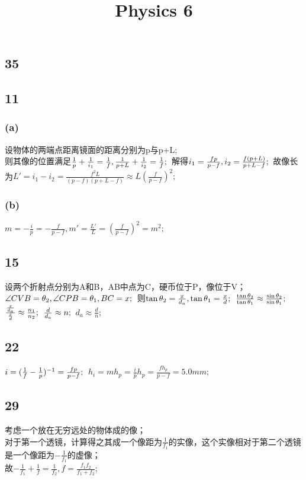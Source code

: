\documentclass{article}
\title{Physics 6}
\begin{document}
	\begin{CJK}{UTF8}{gbsn}
		\maketitle
		\section{35}
		\subsection{11}
		\subsubsection{(a)}
		设物体的两端点距离镜面的距离分别为p与p+L;\\
		则其像的位置满足$\frac{1}{p}+\frac{1}{i_1}=\frac{1}{f},\frac{1}{p+L}+\frac{1}{i_2}=\frac{1}{f};\\$
		解得$i_1=\frac{fp}{p-f},i_2=\frac{f(p+L)}{p+L-f};\\$
		故像长为$L'=i_1-i_2=\frac{f^2L}{(p-f)(p+L-f)}\approx L(\frac{f}{p-f})^2;$
		\subsubsection{(b)}
		$m=-\frac{i}{p}=-\frac{f}{p-f},m'=\frac{L'}{L}=(\frac{f}{p-f})^2=m^2;$
		\subsection{15}
		设两个折射点分别为A和B，AB中点为C，硬币位于P，像位于V；\\
		$\angle CVB=\theta_2,\angle CPB=\theta_1,BC=x;\\$
		则$\tan\theta_2=\frac{x}{d_a},\tan\theta_1=\frac{x}{d};\\$
		$\frac{\tan\theta_2}{\tan\theta_1}\approx\frac{\sin\theta_2}{\sin\theta_1};\\$
		$\frac{\frac{x}{d_a}}{\frac{x}{d}}\approx\frac{n_1}{n_2};\\$
		$\frac{d}{d_a}\approx n;\\$
		$d_a\approx \frac{d}{n};$
		\subsection{22}
		$i=(\frac{1}{f}-\frac{1}{p})^{-1}=\frac{fp}{p-f};\\$
		$h_i=mh_p=\frac{i}{p}h_p=\frac{fh_p}{p-f}=5.0mm;$
		\subsection{29}
		考虑一个放在无穷远处的物体成的像；\\
		对于第一个透镜，计算得之其成一个像距为$\frac{1}{f_1}$的实像，这个实像相对于第二个透镜是一个像距为$-\frac{1}{f_1}$的虚像；\\
		故$-\frac{1}{f_1}+\frac{1}{f}=\frac{1}{f_2},f=\frac{f_1f_2}{f_1+f_2};$

\end{CJK}
\end{document}
